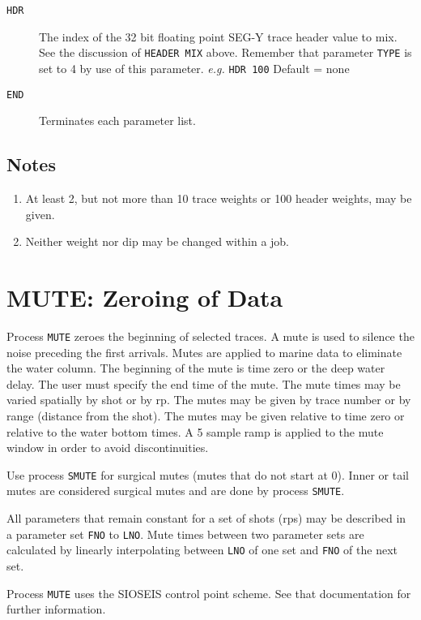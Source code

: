 \begin{description}
\item[\texttt{HDR}] The index of the 32 bit floating point SEG-Y trace header value
         to mix.  See the discussion of \texttt{HEADER MIX} above.  Remember that
         parameter \texttt{TYPE} is set to 4 by use of this parameter.
         \textit{e.g.} \texttt{HDR 100}
         Default = none

\item[\texttt{END}] Terminates each parameter list.
\end{description}

\subsection{Notes}
\begin{enumerate}
\item At least 2, but not more than 10 trace weights or 100 header weights, may be given.
\item Neither weight nor dip may be changed within a job.
\end{enumerate}

\section{MUTE: Zeroing of Data}
\label{cmd_mute}

Process \texttt{MUTE} zeroes the beginning of selected traces.  A mute is used to
silence the noise preceding the first arrivals.  Mutes are applied to
marine data to eliminate the water column.  The beginning of the mute is
time zero or the deep water delay.  The user must specify the end time
of the mute.  The mute times may be varied spatially by \gls{shot} or by \gls{rp}.
The mutes may be given by trace number or by range (distance from the
shot). The mutes may be given relative to time zero or relative to the
water bottom times.  A 5 sample ramp is applied to the mute window in
order to avoid discontinuities.

Use process \texttt{SMUTE} for surgical mutes (mutes that do not start at 0).
Inner or tail mutes are considered surgical mutes and are done by
process \texttt{SMUTE}.

All parameters that remain constant for a set of \glspl{shot} (\glspl{rp}) may be
described in a parameter set \texttt{FNO} to \texttt{LNO}.  Mute times between two
parameter sets are calculated by linearly interpolating between \texttt{LNO} of
one set and \texttt{FNO} of the next set.

Process \texttt{MUTE} uses the SIOSEIS control point scheme.  See that
documentation for further information.

